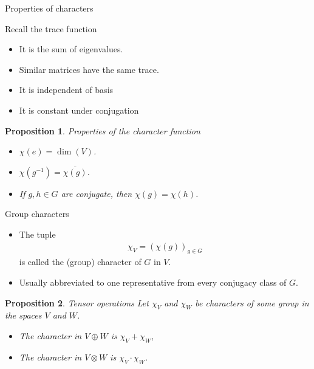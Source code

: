 \documentclass[10pt]{beamer}
\newtheorem{proposition}{Proposition}[theorem]
\begin{document}
	\begin{frame}{Properties of characters}
		\begin{block}{Recall the trace function}
			\begin{itemize}
				\item It is the sum of eigenvalues.
				
				\item Similar matrices have the same trace.
				
				\item It is independent of basis
				
				\item It is constant under conjugation
			\end{itemize}
		\end{block}\pause
		\begin{proposition}{Properties of the character function}
			\begin{itemize}
				
				\item $\chi(e) = \dim(V)$.\pause
				
				\item $\chi(g^{-1}) = \overline{\chi(g)}$.\pause
				
				\item If $g,h \in G$ are conjugate, then $\chi(g) = \chi(h)$.
				
			\end{itemize}
		\end{proposition}
	\end{frame}
	\begin{frame}{Group characters}
		\begin{definition}
			\begin{itemize}
				\item The tuple
			\begin{align*}
				\chi_V = \left(\chi(g)\right)_{g \in G}
			\end{align*}
			is called the \alert{(group) character} of $G$ in $V$.\pause
			
				\item Usually abbreviated to one representative from every conjugacy class of $G$.
			\end{itemize}
		\end{definition}\pause
		
		\begin{proposition}{Tensor operations}
			Let $\chi_V$ and $\chi_W$ be characters of some group in the spaces $V$ and $W$.\pause
			
			\begin{itemize}
				\item The character in $V \oplus W$ is $\chi_V + \chi_W$,\pause
				\item The character in $V \otimes W$ is $\chi_V \cdot \chi_W$.
			\end{itemize}
		\end{proposition}
	\end{frame}
\end{document}
